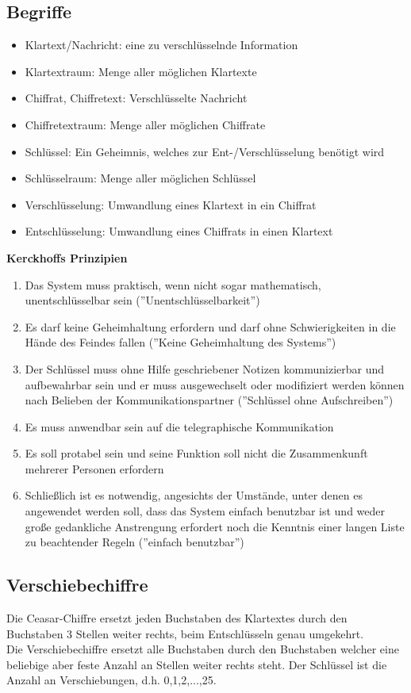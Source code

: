 \documentclass[a4paper,12pt]{article}
\begin{document}
\subsection{Begriffe}
\begin{itemize}
\item Klartext/Nachricht: eine zu verschlüsselnde Information
\item Klartextraum: Menge aller möglichen Klartexte
\item Chiffrat, Chiffretext: Verschlüsselte Nachricht
\item Chiffretextraum: Menge aller möglichen Chiffrate
\item Schlüssel: Ein Geheimnis, welches zur Ent-/Verschlüsselung benötigt wird
\item Schlüsselraum: Menge aller möglichen Schlüssel
\item Verschlüsselung: Umwandlung eines Klartext in ein Chiffrat
\item Entschlüsselung: Umwandlung eines Chiffrats in einen Klartext
\end{itemize}
\textbf{Kerckhoffs Prinzipien}
\begin{enumerate}
\item Das System muss praktisch, wenn nicht sogar mathematisch, unentschlüsselbar sein (''Unentschlüsselbarkeit'')
\item Es darf keine Geheimhaltung erfordern und darf ohne Schwierigkeiten  in die Hände des Feindes fallen (''Keine Geheimhaltung des Systems'')
\item Der Schlüssel muss ohne Hilfe geschriebener Notizen kommunizierbar und aufbewahrbar sein und er muss ausgewechselt oder modifiziert werden können nach Belieben der Kommunikationspartner (''Schlüssel ohne Aufschreiben'')
\item Es muss anwendbar sein auf die telegraphische Kommunikation
\item Es soll protabel sein und seine Funktion soll nicht die Zusammenkunft mehrerer Personen erfordern 
\item Schließlich ist es notwendig, angesichts der Umstände, unter denen es angewendet werden soll, dass das System einfach benutzbar ist und weder große gedankliche Anstrengung erfordert noch die Kenntnis einer langen Liste zu beachtender Regeln (''einfach benutzbar'')
\end{enumerate}
\subsection{Verschiebechiffre}
Die Ceasar-Chiffre ersetzt jeden Buchstaben des Klartextes durch den Buchstaben 3 Stellen weiter rechts, beim Entschlüsseln genau umgekehrt.\\
Die Verschiebechiffre ersetzt alle Buchstaben durch den Buchstaben welcher eine beliebige aber feste Anzahl an Stellen weiter rechts steht. Der Schlüssel ist die Anzahl an Verschiebungen, d.h. 0,1,2,...,25.
\end{document}

